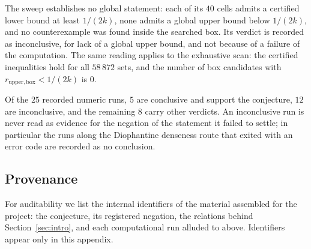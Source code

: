 \documentclass[11pt]{article}
\theoremstyle{plain}
\theoremstyle{definition}
\theoremstyle{remark}
\begin{document}
The sweep establishes no global statement: each of its $40$ cells admits a certified lower bound at
least $1/(2k)$, none admits a global upper bound below $1/(2k)$, and no counterexample was found inside
the searched box. Its verdict is recorded as inconclusive, for lack of a global upper bound, and not
because of a failure of the computation. The same reading applies to the exhaustive scan: the certified
inequalities hold for all $58\,872$ sets, and the number of box candidates with
$r_{\mathrm{upper,box}}<1/(2k)$ is $0$.

Of the $25$ recorded numeric runs, $5$ are conclusive and support the conjecture, $12$ are
inconclusive, and the remaining $8$ carry other verdicts. An inconclusive run is never read as evidence
for the negation of the statement it failed to settle; in particular the runs along the Diophantine
denseness route that exited with an error code are recorded as no conclusion.

\subsection{Provenance}

For auditability we list the internal identifiers of the material assembled for the project: the
conjecture, its registered negation, the relations behind Section~\ref{sec:intro}, and each
computational run alluded to above. Identifiers appear only in this appendix.
\end{document}
